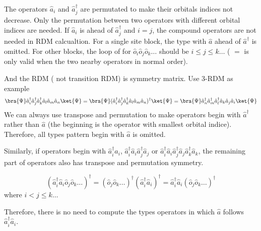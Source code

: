 The operators $\hat{a}_i$ and $\hat{a}^\dagger_j$ are permutated to make their orbitals indices not decrease. Only the permutation between two operators with different orbital indices are needed.
If $\hat{a}_i$ is ahead of $\hat{a}^\dagger_j$ and $i=j$, the compound operators are not needed in RDM calcualtion. For a single site block, the type with $\hat{a}$ ahead of $\hat{a}^\dagger$ is omitted. For other blocks, the loop of for $\hat{o}_i\hat{o}_j\hat{o}_k\dots$ should be $i \le j \le k\dots$ ( $=$ is only valid when the two nearby operators in normal order). 


And the RDM ( not transition RDM) is symmetry matrix. Use 3-RDM as example 
\begin{equation}
  \bra{\Psi}\hat{a}_i^\dagger\hat{a}_j^\dagger\hat{a}^\dagger_k\hat{a}_l\hat{a}_m\hat{a}_n\ket{\Psi}  = \bra{\Psi}(\hat{a}_i^\dagger\hat{a}_j^\dagger\hat{a}^\dagger_k\hat{a}_l\hat{a}_m\hat{a}_n)^\dagger\ket{\Psi} = \bra{\Psi}\hat{a}_n^\dagger\hat{a}_m^\dagger\hat{a}_l^\dagger\hat{a}_k\hat{a}_j\hat{a}_i\ket{\Psi}
\end{equation}
We can always use transpose and permutation to make operators begin with $\hat{a}^\dagger$ rather than $\hat{a}$ (the beginning is the operator with smallest orbital indice). Therefore, all types pattern begin with $\hat{a}$ is omitted. 

Similarly, if operators begin with $\hat{a}^\dagger_i\hat{a}_i$, $\hat{a}^\dagger_i\hat{a}_i\hat{a}^\dagger_j\hat{a}_j$ or $\hat{a}^\dagger_i\hat{a}_i\hat{a}^\dagger_j\hat{a}_j\hat{a}^\dagger_k\hat{a}_k$, the remaining part of operators also has transpose and permutation symmetry.

\begin{equation}
  (\hat{a}^\dagger_i\hat{a}_i \hat{o}_j \hat{o}_k\dots)^\dagger = (\hat{o}_j \hat{o}_k\dots)^\dagger(\hat{a}^\dagger_i\hat{a}_i)^\dagger = \hat{a}^\dagger_i\hat{a}_i(\hat{o}_j \hat{o}_k\dots)^\dagger
\end{equation}
where $i < j\le k\dots$

Therefore, there is no need to compute the types operators in which $\hat{a}$ follows $\hat{a}^\dagger_i\hat{a}_i$.

